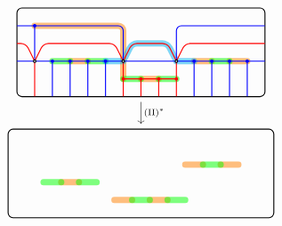 \[\begin{tikzcd}
\begin{tikzpicture}[baseline=-.5ex,scale=1]
\draw[thick, rounded corners] (-4,-1.5) rectangle (3,1);
\begin{scope}
\clip (-4,-1.5) rectangle (3,1);
%
\draw[color=cyclecolor1, rounded corners, line cap=round, line width=5, opacity=0.5] (-3.5,0.5) -- (-1, 0.5) -- (-1, -1) (-2.5,-0.5) -- (-2,-0.5) (-0.5, -1) -- (0, -1) (1, -0.5) -- (1.5, -0.5) (2, -0.5) -- (2.5, -0.5);
\draw[color=cyclecolor2, line cap=round, line width=5, opacity=0.5] (-3,-0.5) -- (-2.5,-0.5) (-2, -0.5) -- (-1.5, -0.5) (-1, -1) -- (-0.5, -1) (0,-1) -- (0.5,-1) (1.5, -0.5) -- (2, -0.5);
\draw[color=cyan, rounded corners, line cap=round, line width=5, opacity=0.5] 
(0.5, -0.5) -- (1, -0.5)
(-1, -0.5) -- (-0.75, 0) -- (0.25, 0) -- (0.5, -0.5)
(-1.5,-0.5) -- (-1,-0.5);
%
\draw[thick, blue, rounded corners] 
(-4,-0.5) -- (4, -0.5)
(-4, 0.5) -- (-1, 0.5) -- (-1, -0.5)
(0.5, -0.5) -- (0.5, 0.5) -- (3,0.5)
;
%
\draw[thick, blue, fill] 
(-3.5, -0.5) -- (-3.5, 0.5) circle (1pt)
(-3, -1.5) -- (-3, -0.5) circle (1pt)
(-2.5, -1.5) -- (-2.5, -0.5) circle (1pt)
(-2, -1.5) -- (-2, -0.5) circle (1pt)
(-1.5,-1.5) -- (-1.5,-0.5) circle (1pt)
(1, -1.5) -- (1, -0.5) circle (1pt)
(1.5, -1.5) -- (1.5, -0.5) circle (1pt)
(2, -1.5) -- (2, -0.5) circle (1pt)
(2.5, -1.5) -- (2.5,-0.5) circle (1pt);
%
\draw[thick, red, fill] 
(-3.5,-1.5) -- (-3.5,-0.5) 
(-1, -1.5) -- (-1, -1) circle (1pt) -- (-1, -0.5)
(-0.5,-1.5) -- (-0.5, -1) circle (1pt) -- (-1, -1) (-0.5, -1) -- (0, -1)
(0, -1.5) -- (0,-1) circle (1pt)
(0.5, -1.5) -- (0.5,-1) circle (1pt) -- (0.5, -0.5) (0.5, -1) -- (0, -1);
\draw[thick, red, rounded corners] (-4,0) -- (-3.75,0) -- (-3.5,-0.5) (-3.5, -0.5) -- (-3.25, 0) -- (-1.25, 0) -- (-1, -0.5) 
(-1, -0.5) -- (-0.75, 0) -- (0.25, 0) -- (0.5, -0.5)
(0.5, -0.5) -- (0.75, 0) -- (1, 0) -- (3,0);
%
\foreach \x in {-3.5, -1, 0.5} {
\draw[thick, fill=white] (\x,-0.5) circle (1pt) ;
}
\end{scope}
\end{tikzpicture}
\arrow[d, "\Move{II}^*"]\\
\begin{tikzpicture}[baseline=-.5ex,scale=1]
\draw[thick, rounded corners] (-4.5,-1.5) rectangle (3,1);
\begin{scope}
\clip (-4.5,-1.5) rectangle (3,1);
%
\draw[color=cyclecolor1, rounded corners, line cap=round, line width=5, opacity=0.5] (-1.5, -1) -- (-1, -1) (-3,-0.5) -- (-2.5,-0.5) (-0.5, -1) -- (0, -1) (0.5, 0) -- (1, 0) (1.5, 0) -- (2, 0);
\draw[color=cyclecolor2, line cap=round, line width=5, opacity=0.5] (-3.5,-0.5) -- (-3,-0.5) (-2.5, -0.5) -- (-2, -0.5) (-1, -1) -- (-0.5, -1) (0,-1) -- (0.5,-1) (1, 0) -- (1.5, 0);

\end{scope}
\end{tikzpicture}
\end{tikzcd}\]
